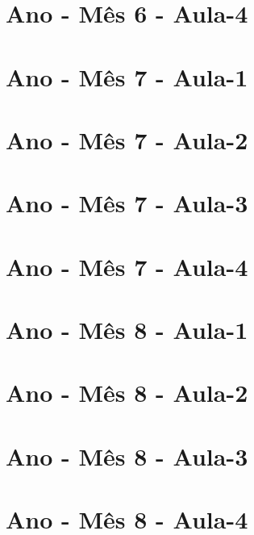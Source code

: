 \begin{multicols}{2}
\section[\sffamily 2\textordmasculine\space Ano - Mês 6 - Aula-4]{\textordmasculine\space Ano - Mês 6 - Aula-4}


\section[\sffamily 2\textordmasculine\space Ano - Mês 7 - Aula-1]{\textordmasculine\space Ano - Mês 7 - Aula-1}


\section[\sffamily 2\textordmasculine\space Ano - Mês 7 - Aula-2]{\textordmasculine\space Ano - Mês 7 - Aula-2}


\section[\sffamily 2\textordmasculine\space Ano - Mês 7 - Aula-3]{\textordmasculine\space Ano - Mês 7 - Aula-3}


\section[\sffamily 2\textordmasculine\space Ano - Mês 7 - Aula-4]{\textordmasculine\space Ano - Mês 7 - Aula-4}


\section[\sffamily 2\textordmasculine\space Ano - Mês 8 - Aula-1]{\textordmasculine\space Ano - Mês 8 - Aula-1}


\section[\sffamily 2\textordmasculine\space Ano - Mês 8 - Aula-2]{\textordmasculine\space Ano - Mês 8 - Aula-2}


\section[\sffamily 2\textordmasculine\space Ano - Mês 8 - Aula-3]{\textordmasculine\space Ano - Mês 8 - Aula-3}


\section[\sffamily 2\textordmasculine\space Ano - Mês 8 - Aula-4]{\textordmasculine\space Ano - Mês 8 - Aula-4}


\end{multicols}

